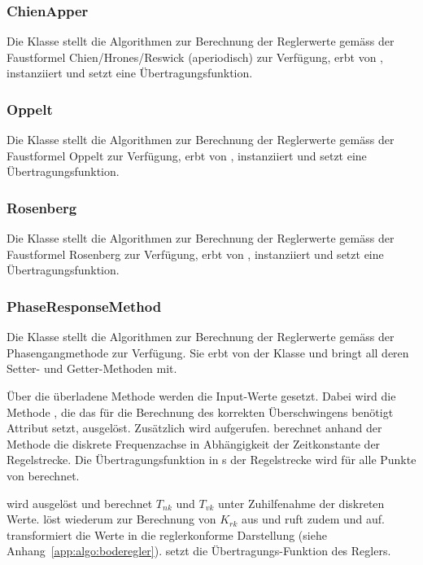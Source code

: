 \subsubsection*{ChienApper}
Die  Klasse    stellt  die  Algorithmen  zur  Berechnung  der
Reglerwerte  gem\"ass   der  Faustformel   Chien/Hrones/Reswick  (aperiodisch)
zur  Verf\"ugung,  erbt von  ,  instanziiert  und setzt  eine
\"Ubertragungsfunktion.


\subsubsection*{Oppelt}
Die Klasse  stellt die Algorithmen zur Berechnung der Reglerwerte
gem\"ass der  Faustformel Oppelt zur Verf\"ugung,  erbt von ,
instanziiert und setzt eine \"Ubertragungsfunktion.


\subsubsection*{Rosenberg}
Die  Klasse    stellt   die  Algorithmen  zur  Berechnung  der
Reglerwerte  gem\"ass  der Faustformel  Rosenberg  zur  Verf\"ugung, erbt  von
, instanziiert und setzt eine \"Ubertragungsfunktion.


\subsubsection*{PhaseResponseMethod}
Die Klasse   stellt  die Algorithmen  zur Berechnung
der Reglerwerte  gem\"ass der Phasengangmethode zur  Verf\"ugung. Sie erbt von
der Klasse  und bringt  all deren Setter- und Getter-Methoden
mit.

\"Uber  die  \"uberladene  Methode    werden  die  Input-Werte
gesetzt. Dabei wird die Methode , die das f\"ur die
Berechnung  des  korrekten  \"Uberschwingens ben\"otigt  Attribut  
setzt,    ausgel\"ost. Zus\"atzlich   wird       aufgerufen.
  berechnet  anhand   der  Methode  
die   diskrete  Frequenzachse   in   Abh\"angigkeit   der  Zeitkonstante   der
Regelstrecke. Die \"Ubertragungsfunktion in s der Regelstrecke wird f\"ur alle
Punkte von  berechnet.

  wird ausgel\"ost  und berechnet  $T_{nk}$ und  $T_{vk}$
unter   Zuhilfenahme  der   diskreten   Werte.     l\"ost
wiederum     zur   Berechnung   von   $K_{rk}$  aus   und
ruft   zudem      und      auf.
 transformiert die Werte in die reglerkonforme
Darstellung  (siehe  Anhang~\ref{app:algo:boderegler}).   setzt
die \"Ubertragungs-Funktion des Reglers.



